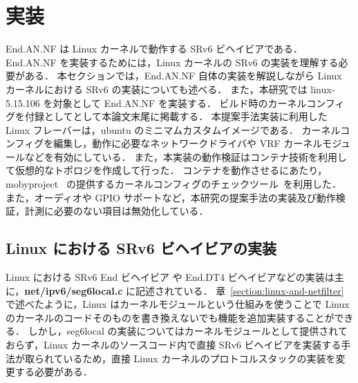 \section{実装}
\label{section:implementation}
End.AN.NF は Linux カーネルで動作する SRv6 ビヘイビアである．
End.AN.NF を実装するためには，Linux カーネルの SRv6 の実装を理解する必要がある．
本セクションでは，End.AN.NF 自体の実装を解説しながら Linux カーネルにおける SRv6 の実装についても述べる．
また，本研究では linux-5.15.106 を対象として End.AN.NF を実装する．
ビルド時のカーネルコンフィグを付録としてとして本論文末尾に掲載する．
本提案手法実装に利用した Linux フレーバーは，ubuntu のミニマムカスタムイメージである．
カーネルコンフィグを編集し，動作に必要なネットワークドライバや VRF カーネルモジュールなどを有効にしている．
また，本実装の動作検証はコンテナ技術を利用して仮想的なトポロジを作成して行った．
コンテナを動作させるにあたり，mobyproject~\cite{mobysh} の提供するカーネルコンフィグのチェックツール~\cite{mobysh}を利用した．
また，オーディオや GPIO サポートなど，本研究の提案手法の実装及び動作検証，計測に必要のない項目は無効化している．

\subsection{Linux における SRv6 ビヘイビアの実装}
\label{sbsection:linux-packet-forwarding}
Linux における SRv6 End ビヘイビア や End.DT4 ビヘイビアなどの実装は主に，\textbf{net/ipv6/seg6local.c} に記述されている．
章~\ref{section:linux-and-netfilter} で述べたように，Linux はカーネルモジュールという仕組みを使うことで Linux のカーネルのコードそのものを書き換えないでも機能を追加実装することができる．
しかし，seg6local の実装についてはカーネルモジュールとして提供されておらず，Linux カーネルのソースコード内で直接 SRv6 ビヘイビアを実装する手法が取られているため，直接 Linux カーネルのプロトコルスタックの実装を変更する必要がある．


